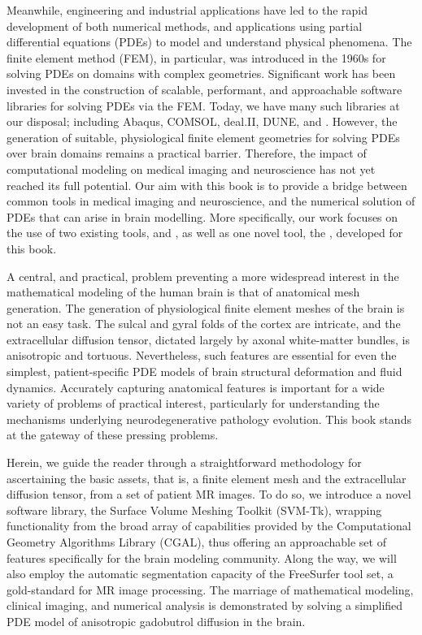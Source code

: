 Meanwhile, engineering and industrial applications have led to the
rapid development of both numerical methods, and applications using
partial differential equations (PDEs) to model and understand physical
phenomena. The finite element method (FEM), in particular, was
introduced in the 1960s for solving PDEs on domains with complex
geometries. Significant work has been invested in the construction of
scalable, performant, and approachable software libraries for solving
PDEs via the FEM. Today, we have many such libraries at our disposal;
including Abaqus, COMSOL, deal.II, DUNE, and {\fenics}. However, the
generation of suitable, physiological finite element geometries for
solving PDEs over brain domains remains a practical
barrier. Therefore, the impact of computational modeling on medical
imaging and neuroscience has not yet reached its full potential. Our
aim with this book is to provide a bridge between common tools in
medical imaging and neuroscience, and the numerical solution of PDEs
that can arise in brain modelling.  More specifically, our work focuses 
on the use of two existing tools, {\freesurfer} and {\fenics}, as well as 
one novel tool, the {\svmtk}, developed for this book.

 
A central, and practical, problem preventing a more widespread interest in the 
mathematical modeling of the human brain is that of anatomical mesh generation. 
The generation of physiological finite element meshes of the brain is not an 
easy task. The sulcal and gyral folds of the cortex are intricate, 
and the extracellular diffusion tensor, dictated largely by axonal white-matter 
bundles, is anisotropic and tortuous. Nevertheless, such features are essential 
for even the simplest, patient-specific PDE models of brain structural 
deformation and fluid dynamics. Accurately capturing anatomical features is
important for a wide variety of problems of practical interest,
particularly for understanding the mechanisms underlying
neurodegenerative pathology evolution. This book stands at the gateway
of these pressing problems.

Herein, we guide the reader through a straightforward methodology for
ascertaining the basic assets, that is, a finite element mesh and the
extracellular diffusion tensor, from a set of patient MR images. To do
so, we introduce a novel software library, the Surface Volume Meshing
Toolkit (SVM-Tk), wrapping functionality from the broad array of
capabilities provided by the Computational Geometry Algorithms Library
(CGAL), thus offering an approachable set of features specifically for
the brain modeling community. Along the way, we will also employ the
automatic segmentation capacity of the FreeSurfer tool set, a
gold-standard for MR image processing. The marriage of mathematical
modeling, clinical imaging, and numerical analysis is demonstrated by
solving a simplified PDE model of anisotropic gadobutrol diffusion in
the brain.

